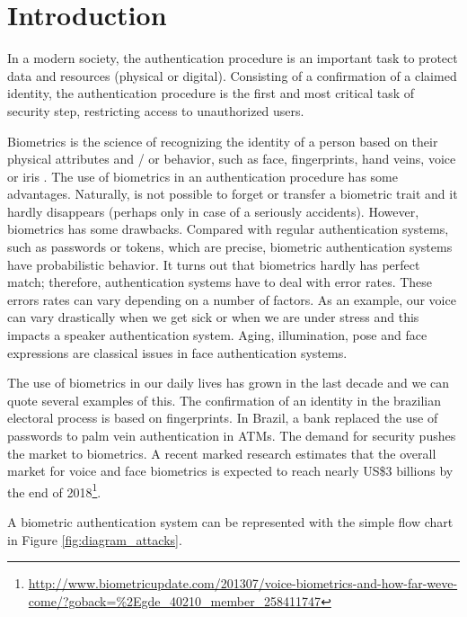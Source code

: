 \chapter{Introduction}
\label{chap:introduction}

In a modern society, the authentication procedure is an important task to protect data and resources (physical or digital). Consisting of a confirmation of a claimed identity, the authentication procedure is the first and most critical task of security step, restricting access to unauthorized users. 

Biometrics is the science of recognizing the identity of a person based on their physical attributes and / or behavior, such as face, fingerprints, hand veins, voice or iris \cite{li2011handbook}. The use of biometrics in an authentication procedure has some advantages. Naturally, is not possible to forget or transfer a biometric trait and it hardly disappears (perhaps only in case of a seriously accidents). However, biometrics has some drawbacks. Compared with regular authentication systems, such as passwords or tokens, which are precise, biometric authentication systems have probabilistic behavior. It turns out that biometrics hardly has perfect match; therefore, authentication systems have to deal with error rates. These errors rates can vary depending on a number of factors. As an example, our voice can vary drastically  when we get sick or when we are under stress and this impacts a speaker authentication system. Aging, illumination, pose and face expressions are classical issues in face authentication systems.

The use of biometrics in our daily lives has grown in the last decade and we can quote several examples of this. The confirmation of an identity in the brazilian electoral process is based on fingerprints. In Brazil, a bank replaced the use of passwords to palm vein authentication in ATMs. The demand for security pushes the market to biometrics. A recent marked research estimates that the overall market for voice and face biometrics is expected to reach nearly US\$3 billions by the end of 2018\footnote{\url{http://www.biometricupdate.com/201307/voice-biometrics-and-how-far-weve-come/?goback=\%2Egde\_40210\_member\_258411747}}.


A biometric authentication system can be represented with the simple flow chart in Figure \ref{fig:diagram_attacks}.

